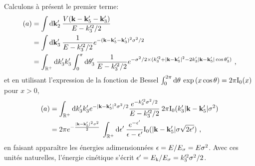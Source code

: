 Calculons à présent le premier terme:
\begin{align}
(a)&= \int{\mathop{}\mathopen{}\mathrm{d}\mathbf{k}_{\mathrm{2}}' \: \frac{V(\mathbf{k}-\mathbf{k}_{\mathrm{5}}'-\mathbf{k}_{\mathrm{3}}')}{E-k_{\mathrm{3}}'^2/2}} \\
&= \int{\mathop{}\mathopen{}\mathrm{d}\mathbf{k}_{\mathrm{3}}' \: \frac{1}{E-k_{\mathrm{3}}'^2/2} e^{-(\mathbf{k}-\mathbf{k}_{\mathrm{5}}'-\mathbf{k}_{\mathrm{3}}')^2 \sigma^2/2}} \\
&= \int_{\mathbb{R}^+}{\mathop{}\mathopen{}\mathrm{d} k_{\mathrm{3}}' k_{\mathrm{3}}' \int_0^{\pi}{\mathop{}\mathopen{}\mathrm{d}\theta_{\mathrm{3}}'\: \frac{1}{E-k_{\mathrm{3}}'^2/2}e^{-\sigma^2/2\times (k_{\mathrm{3}}'^2+|\mathbf{k}-\mathbf{k}_{\mathrm{5}}'|^2-2k_{\mathrm{3}}' |\mathbf{k}-\mathbf{k}_{\mathrm{5}}'| \cos{\theta_{\mathrm{3}}'})}}} \text{ ,}
\end{align}
et en utilisant l'expression de la fonction de Bessel $\int_0^{2\pi}{\mathop{}\mathopen{}\mathrm{d}\theta\:\exp{(x\cos{\theta})}} =2\pi \mathrm{I_0}(x)$ pour $x>0$,
\begin{align}
(a)&=\int_{\mathbb{R}^+}{\mathop{}\mathopen{}\mathrm{d} k_{\mathrm{3}}' k_{\mathrm{3}}' e^{-|\mathbf{k}-\mathbf{k}_{\mathrm{5}}'|^2 \sigma^2/2} \frac{e^{-k_{\mathrm{3}}'^2\sigma^2/2}}{E-k_{\mathrm{3}}'^2/2} \: 2\pi \mathrm{I_0}(k_{\mathrm{3}}' |\mathbf{k}-\mathbf{k}_{\mathrm{5}}'|\sigma^2)} \\
&= 2\pi e^{-\frac{|\mathbf{k}-\mathbf{k}_{\mathrm{5}}'|^2\sigma^2}{2}} \: \int_{\mathbb{R}^+}{\mathop{}\mathopen{}\mathrm{d}\epsilon'\:\frac{e^{-\epsilon'}}{\epsilon-\epsilon'}\mathrm{I_0}(|\mathbf{k}-\mathbf{k}_{\mathrm{5}}'|\sigma\sqrt{2\epsilon'})} \text{ ,}
\end{align}
en faisant apparaître les énergies adimensionnées $\epsilon=E/E_{\sigma}=E\sigma^2$. Avec ces unités naturelles, l'énergie cinétique s'écrit $\epsilon'=E_{\mathrm{k}}/E_{\sigma}=k_{\mathrm{3}}'^2\sigma^2/2$.

